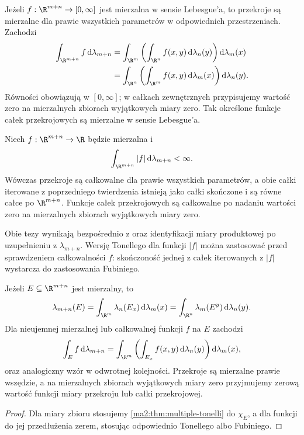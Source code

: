 \begin{twierdzenie}
\label{ma2:thm:multiple-tonelli}
Jeżeli $f:\R^{m+n}\to[0,\infty]$ jest mierzalna
w sensie Lebesgue'a, to przekroje są mierzalne
dla prawie wszystkich parametrów w odpowiednich
przestrzeniach. Zachodzi
\[
 \begin{aligned}
 \int_{\R^{m+n}} f\,\mathrm d\lambda_{m+n}
 &=\int_{\R^m}\left(\int_{\R^n}f(x,y)\,
   \mathrm d\lambda_n(y)\right)\mathrm d\lambda_m(x)\\
 &=\int_{\R^n}\left(\int_{\R^m}f(x,y)\,
   \mathrm d\lambda_m(x)\right)\mathrm d\lambda_n(y).
 \end{aligned}
\]
Równości obowiązują w $[0,\infty]$; w całkach
zewnętrznych przypisujemy wartość zero na
mierzalnych zbiorach wyjątkowych miary zero.
Tak określone funkcje całek przekrojowych są
mierzalne w sensie Lebesgue'a.
\end{twierdzenie}

\begin{twierdzenie}
\label{ma2:thm:multiple-fubini}
Niech $f:\R^{m+n}\to\R$ będzie mierzalna i
\[
 \int_{\R^{m+n}}|f|\,\mathrm d\lambda_{m+n}<\infty.
\]
Wówczas przekroje są całkowalne dla prawie
wszystkich parametrów, a obie całki iterowane
z poprzedniego twierdzenia istnieją jako całki
skończone i są równe całce po $\R^{m+n}$.
Funkcje całek przekrojowych są całkowalne
po nadaniu wartości zero na mierzalnych zbiorach
wyjątkowych miary zero.
\end{twierdzenie}
Obie tezy wynikają bezpośrednio z
oraz identyfikacji miary produktowej po uzupełnieniu
z $\lambda_{m+n}$.
Wersję Tonellego dla funkcji $|f|$
można zastosować przed sprawdzeniem całkowalności
$f$: skończoność jednej z całek iterowanych
z $|f|$ wystarcza do zastosowania Fubiniego.

\begin{wniosek}
\label{ma2:cor:multiple-sections}
Jeżeli $E\subseteq\R^{m+n}$ jest mierzalny,
to
\[
 \lambda_{m+n}(E)=
 \int_{\R^m}\lambda_n(E_x)\,\mathrm d\lambda_m(x)
 =\int_{\R^n}\lambda_m(E^y)\,\mathrm d\lambda_n(y).
\]
Dla nieujemnej mierzalnej lub całkowalnej funkcji
$f$ na $E$ zachodzi
\[
 \int_E f\,\mathrm d\lambda_{m+n}
 =\int_{\R^m}
 \left(\int_{E_x}f(x,y)\,\mathrm d\lambda_n(y)\right)
 \mathrm d\lambda_m(x),
\]
oraz analogiczny wzór w odwrotnej kolejności.
Przekroje są mierzalne prawie wszędzie, a na
mierzalnych zbiorach wyjątkowych miary zero
przyjmujemy zerową wartość funkcji miary przekroju
lub całki przekrojowej.
\end{wniosek}
\begin{proof}
Dla miary zbioru stosujemy
\ref{ma2:thm:multiple-tonelli} do $\chi_E$,
a dla funkcji do jej przedłużenia zerem,
stosując odpowiednio Tonellego albo Fubiniego.
\end{proof}

